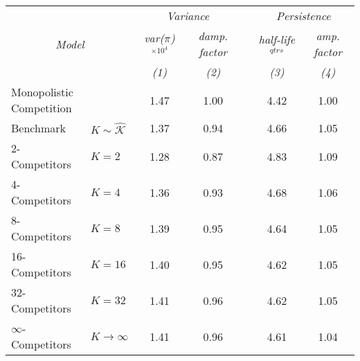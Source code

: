 \begin{tabular}{llccccc}
	 && \multicolumn{2}{c}{\emph{Variance}} && \multicolumn{2}{c}{\emph{Persistence}}\\ 
 	 \cline{3-4} \cline{6-7} 
	 \multicolumn{2}{c}{\emph{Model}} & \emph{var($\pi$) $^{\times 10^{4}}$} & \emph{damp. factor} && \emph{half-life} $^{qtrs}$ & \emph{amp. factor} \\ 
	 && \emph{(1)} & \emph{(2)} && \emph{(3)} & \emph{(4)} \\ 
	 \hline 
	 \multicolumn{2}{l|}{Monopolistic Competition} & 1.47 & 1.00 && 4.42 & 1.00 \\ 
	 Benchmark & \multicolumn{1}{l|}{$K\sim \hat{\mathcal{K}}$} & 1.37 & 0.94 && 4.66 & 1.05 \\ 
	 \hline 
	 2-Competitors & \multicolumn{1}{l|}{$K=2$} & 1.28 & 0.87 && 4.83 & 1.09 \\ 
	 4-Competitors & \multicolumn{1}{l|}{$K=4$} & 1.36 & 0.93 && 4.68 & 1.06 \\ 
	 8-Competitors & \multicolumn{1}{l|}{$K=8$} & 1.39 & 0.95 && 4.64 & 1.05 \\ 
	 16-Competitors & \multicolumn{1}{l|}{$K=16$} & 1.40 & 0.95 && 4.62 & 1.05 \\ 
	 32-Competitors & \multicolumn{1}{l|}{$K=32$} & 1.41 & 0.96 && 4.62 & 1.05 \\ 
	 $\infty$-Competitors & \multicolumn{1}{l|}{$K\to\infty$} & 1.41 & 0.96 && 4.61 & 1.04 \\ 
	 \hline 
\end{tabular}